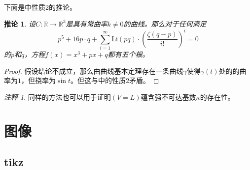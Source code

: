 \documentclass[openany,oneside]{book}
\theoremstyle{cthmstyle}
\newtheorem{cor}{推论}
\theoremstyle{definition}
\theoremstyle{remark}
\newtheorem*{rem*}{注释}
\begin{document}
下面是\cite{bzj2006constcurative}中性质2的推论。

\begin{cor}
设$C:\mathbb R\to \mathbb R^3$是具有常曲率$k\ne 0$的曲线。那么对于任何满足\[p^5+16p\cdot q+ \sum_{i=1}^{\infty} \mathrm{Li}(pq)\cdot\left(\frac {\zeta(q-p)} {i!}\right)^i = 0\]的$p$和$q$，方程$f(x)=x^3+px+q$都有五个根。
\end{cor}

\begin{proof}
假设结论不成立，那么由曲线基本定理存在一条曲线$\gamma$使得$\gamma(t)$处的的曲率为$1$，但挠率为$\sin t$。但这与\cite{bzj2006constcurative}中的性质2矛盾。
\end{proof}

\begin{rem*}
同样的方法也可以用于证明$(V=L)$蕴含强不可达基数$\kappa$的存在性。
\end{rem*}


\section{图像}
\subsection{tikz}
\end{document}
